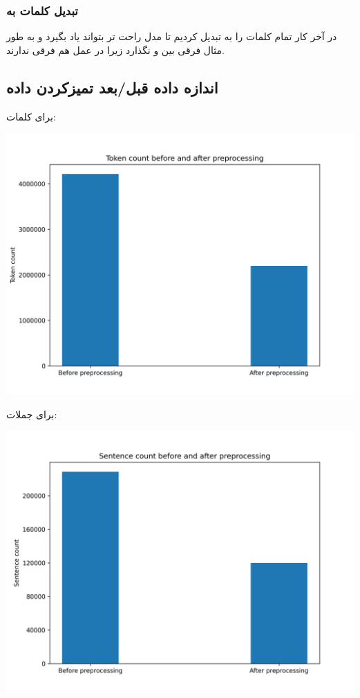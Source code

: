 {{		\subsubsection{\Large تبدیل کلمات به }
		{
			در آخر کار تمام کلمات را به 
			تبدیل کردیم تا مدل راحت تر بتواند یاد بگیرد و به طور مثال فرقی بین 
			 و 
			نگذارد زیرا در عمل هم فرقی ندارند.
		}
	}
	\newpage
	\subsection{اندازه داده قبل/بعد تمیزکردن داده}
	{
		برای کلمات:
		\begin{center}
			\includegraphics[scale=0.55]{../stats/token_counts_befor_after_pre_processing.png}
		\end{center}
		
		
		برای جملات:
		\begin{center}
			\includegraphics[scale=0.55]{../stats/sentence_counts_befor_after_pre_processing.png}
		\end{center}
	}
}